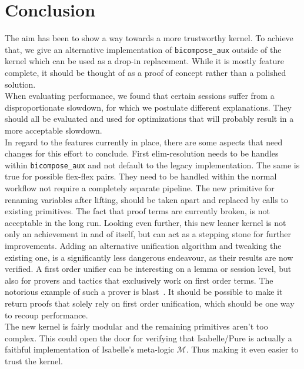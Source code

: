 \chapter{Conclusion}\label{chapter:conclusion}

The aim has been to show a way towards a more trustworthy kernel. To achieve that, we give an alternative implementation of \texttt{bicompose\_aux} outside of the kernel which can be used as a drop-in replacement. While it is mostly feature complete, it should be thought of as a proof of concept rather than a polished solution.\\
When evaluating performance, we found that certain sessions suffer from a disproportionate slowdown, for which we postulate different explanations. They should all be evaluated and used for optimizations that will probably result in a more acceptable slowdown.\\
In regard to the features currently in place, there are some aspects that need changes for this effort to conclude. First elim-resolution needs to be handles within \texttt{bicompose\_aux} and not default to the legacy implementation. The same is true for possible flex-flex pairs. They need to be handled within the normal workflow not require a completely separate pipeline. The new primitive for renaming variables after lifting, should be taken apart and replaced by calls to existing primitives. The fact that proof terms are currently broken, is not acceptable in the long run.
Looking even further, this new leaner kernel is not only an achievement in and of itself, but can act as a stepping stone for further improvements. Adding an alternative unification algorithm and tweaking the existing one, is a significantly less dangerous endeavour, as their results are now verified. A first order unifier can be interesting on a lemma or session level, but also for provers and tactics that exclusively work on first order terms. The notorious example of such a prover is blast~\parencite{Paulson1999}. It should be possible to make it return proofs that solely rely on first order unification, which should be one way to recoup performance.\\
The new kernel is fairly modular and the remaining primitives aren't too complex. This could open the door for verifying that Isabelle/Pure is actually a faithful implementation of Isabelle's meta-logic $\mathcal{M}$. Thus making it even easier to trust the kernel.

